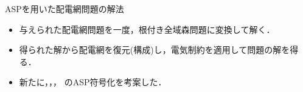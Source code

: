 \documentclass[dvipdfmx,11pt]{beamer}
\begin{document}
\begin{frame}{ASPを用いた配電網問題の解法}
 \centering
  \scalebox{0.8}{}
 \vfill
\begin{itemize}
 \item 与えられた配電網問題を一度，根付き全域森問題に変換して解く．
 \item 得られた解から配電網を復元(構成)し，電気制約を適用して問題の解を得る．
 \item 新たに，，，
       のASP符号化を考案した．
\end{itemize}
\end{frame}
\end{document}
